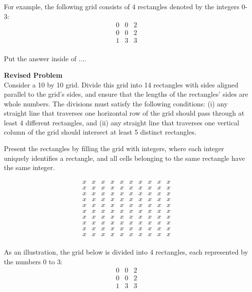 For example, the following grid consists of 4 rectangles denoted by the integers 0-3:
$$
\begin{array}{ccc}
0 & 0 & 2 \\
0 & 0 & 2 \\
1 & 3 & 3 \\
\end{array}
$$

Put the answer inside of $\boxed{...}$.


\textbf{Revised Problem}\\
Consider a 10 by 10 grid. Divide this grid into 14 rectangles with sides aligned parallel to the grid's sides, and ensure that the lengths of the rectangles' sides are whole numbers. The divisions must satisfy the following conditions: (i) any straight line that traverses one horizontal row of the grid should pass through at least 4 different rectangles, and (ii) any straight line that traverses one vertical column of the grid should intersect at least 5 distinct rectangles.

Present the rectangles by filling the grid with integers, where each integer uniquely identifies a rectangle, and all cells belonging to the same rectangle have the same integer.

$$\begin{array}{cccccccccc}
x & x & x & x & x & x & x & x & x & x \\
x & x & x & x & x & x & x & x & x & x \\
x & x & x & x & x & x & x & x & x & x \\
x & x & x & x & x & x & x & x & x & x \\
x & x & x & x & x & x & x & x & x & x \\
x & x & x & x & x & x & x & x & x & x \\
x & x & x & x & x & x & x & x & x & x \\
x & x & x & x & x & x & x & x & x & x \\
x & x & x & x & x & x & x & x & x & x \\
x & x & x & x & x & x & x & x & x & x \\
\end{array}$$

As an illustration, the grid below is divided into 4 rectangles, each represented by the numbers 0 to 3:
$$
\begin{array}{ccc}
0 & 0 & 2 \\
0 & 0 & 2 \\
1 & 3 & 3 \\
\end{array}
$$

